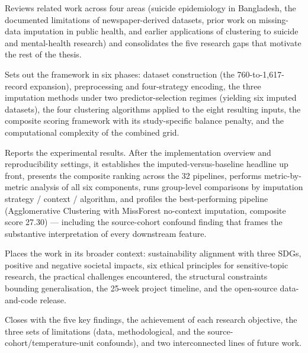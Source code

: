 \begin{description}[leftmargin=2em,labelindent=0pt,itemsep=0.4em]
  \item[\textbf{Chapter~2 --- Background and Literature Review.}] Reviews related work across four areas (suicide epidemiology in Bangladesh, the documented limitations of newspaper-derived datasets, prior work on missing-data imputation in public health, and earlier applications of clustering to suicide and mental-health research) and consolidates the five research gaps that motivate the rest of the thesis.
  \item[\textbf{Chapter~3 --- Research Methodology.}] Sets out the framework in six phases: dataset construction (the 760-to-1{,}617-record expansion), preprocessing and four-strategy encoding, the three imputation methods under two predictor-selection regimes (yielding six imputed datasets), the four clustering algorithms applied to the eight resulting inputs, the composite scoring framework with its study-specific balance penalty, and the computational complexity of the combined grid.
  \item[\textbf{Chapter~4 --- Implementation and Result Analysis.}] Reports the experimental results. After the implementation overview and reproducibility settings, it establishes the imputed-versus-baseline headline up front, presents the composite ranking across the 32 pipelines, performs metric-by-metric analysis of all six components, runs group-level comparisons by imputation strategy / context / algorithm, and profiles the best-performing pipeline (Agglomerative Clustering with MissForest no-context imputation, composite score 27.30) --- including the source-cohort confound finding that frames the substantive interpretation of every downstream feature.
  \item[\textbf{Chapter~5 --- Standards, Constraints, and Milestones.}] Places the work in its broader context: sustainability alignment with three SDGs, positive and negative societal impacts, six ethical principles for sensitive-topic research, the practical challenges encountered, the structural constraints bounding generalisation, the 25-week project timeline, and the open-source data-and-code release.
  \item[\textbf{Chapter~6 --- Conclusion.}] Closes with the five key findings, the achievement of each research objective, the three sets of limitations (data, methodological, and the source-cohort/temperature-unit confounds), and two interconnected lines of future work.
\end{description}

